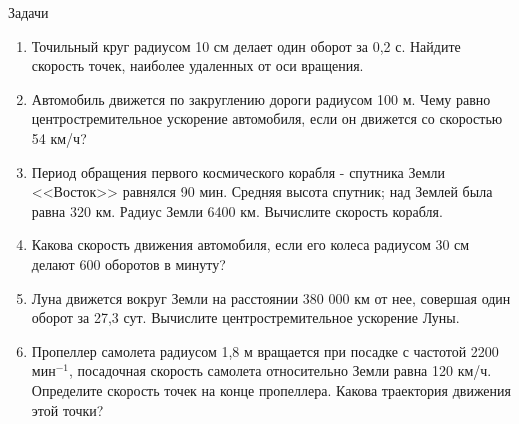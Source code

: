 \documentclass[a5paper, 10pt]{diss_4}
\renewcommand{\'}{\,'}
\begin{document}
\begin{center}
   Задачи
\end{center}
\begin{enumerate}
\item Точильный круг радиусом 10 см делает  один  оборот  за 0,2 с. Найдите  скорость точек,   наиболее   удаленных   от   оси   вращения.
\item Автомобиль движется по закруглению дороги радиусом 100 м. Чему равно центростремительное ускорение  автомобиля,  если он движется со скоростью 54 км/ч?
\item Период   обращения    первого    космического корабля - спутника Земли <<Восток>> равнялся 90 мин. Средняя высота спутник; над Землей была равна 320 км. Радиус Земли 6400 км. Вычислите скорость корабля.
\item Какова скорость  движения автомобиля, если его колеса радиусом 30 см делают 600 оборотов в минуту?
\item Луна движется  вокруг Земли  на расстоянии  380 000  км  от  нее,   совершая  один оборот за 27,3 сут. Вычислите центростремительное ускорение Луны.
\item Пропеллер самолета радиусом 1,8 м вращается при посадке с частотой 2200 $мин^{-1}$, посадочная скорость самолета относительно Земли равна 120 км/ч. Определите скорость точек на конце пропеллера. Какова траектория движения этой точки?
\end{enumerate}
\end{document}
